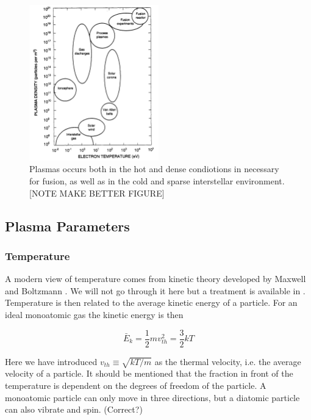 	\begin{figure}
		\begin{center}
			\includegraphics[width = 0.5\textwidth]{figures/theory/plasma_density}
		\end{center}
		\caption{Plasmas occurs both in the hot and dense condiotions in necessary for fusion, as
		well as in the cold and sparse interstellar environment. [NOTE MAKE BETTER FIGURE]
		}
	\end{figure}



    \subsection{Plasma Parameters}
		\label{sec:parameters}
		\subsubsection{Temperature}
		A modern view of temperature comes from kinetic theory developed by
		Maxwell and Boltzmann \citep{swendsen_statistical_2006}. We will not go through it
		here but a treatment is available in \citet{goldston_introduction_1995}.
		Temperature is then related to the average kinetic energy of a particle.
		For an ideal monoatomic gas the kinetic energy is then

		\begin{equation}
			\bar{E}_k = \frac{1}{2} m v_{th}^2 = \frac{3}{2} kT \label{eq:temperature}
		\end{equation}

		Here we have introduced \(v_{th} \equiv  \sqrt{kT/m}\) as the thermal velocity, i.e.
		the average velocity of a particle. It should be mentioned that the fraction in
		front of the temperature is dependent on the degrees of freedom of the particle.
		A monoatomic particle can only move in three directions, but a diatomic particle
		can also vibrate and spin. (Correct?)

